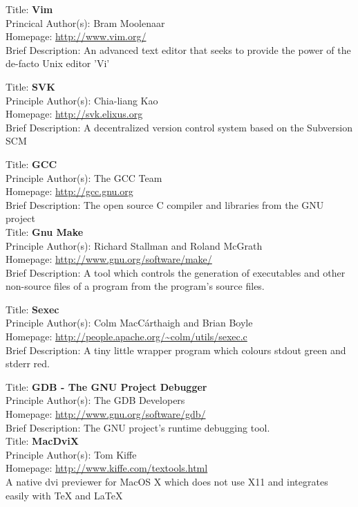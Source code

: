 
Title: 	\textbf{Vim}	\\
Princical Author(s): 	Bram Moolenaar	\\
Homepage: 	\url{http://www.vim.org/}	\\	
Brief Description: 		An advanced text editor that seeks to provide the power of the 
de-facto Unix editor 'Vi'


Title:		\textbf{SVK}	\\
Principle Author(s): 	Chia-liang Kao	\\
Homepage:		\url{http://svk.elixus.org}	\\
Brief Description:		A decentralized version control system based on the Subversion
SCM


Title:		\textbf{GCC}	\\	
Principle Author(s): 	The GCC Team	\\
Homepage:		\url{http://gcc.gnu.org}	\\
Brief Description:		The open source C compiler and libraries from the GNU project \\


Title:		\textbf{Gnu Make}	\\
Principle Author(s): 	Richard Stallman and Roland McGrath	\\
Homepage:		\url{http://www.gnu.org/software/make/} \\
Brief Description:		A tool which controls the generation of executables and other
non-source files of a program from the program's source files.


Title: 		\textbf{Sexec}	\\
Principle Author(s): 	Colm MacC\'{a}rthaigh and Brian Boyle	\\
Homepage:		\url{http://people.apache.org/~colm/utils/sexec.c} \\
Brief Description:		A tiny little wrapper program which colours stdout green 
and stderr red.


Title:		\textbf{GDB - The GNU Project Debugger}	\\	
Principle Author(s): 	The GDB Developers	\\
Homepage:		\url{http://www.gnu.org/software/gdb/}	\\
Brief Description: The GNU project's runtime debugging tool. \\


Title:		\textbf{MacDviX}	\\	
Principle Author(s): 	Tom Kiffe \\
Homepage:		\url{http://www.kiffe.com/textools.html}	\\
A native dvi previewer for MacOS X which does not use X11 and 
integrates easily with \textrm{\TeX{}} and \textrm{\LaTeX{}} \\


